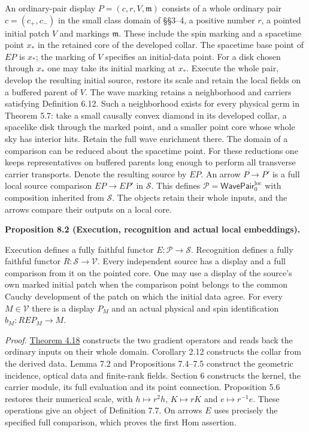 \documentclass[
  english,
  11pt,
  reqno]{amsart}
\makeatletter
\newcommand{\pandocstatementheading}[1]{%
  \par\addpenalty{\@beginparpenalty}%
  \addvspace{.5\baselineskip plus .2\baselineskip minus .2\baselineskip}%
  {\normalfont\bfseries #1\par}%
  \nobreak\@afterindenttrue\@afterheading
}
\makeatother
\begin{document}
An ordinary-pair display \(P=(c,r,V,\mathfrak m)\) consists of a whole
ordinary pair \(c=(c_+,c_-)\) in the small class domain of §§3--4, a
positive number \(r\), a pointed initial patch \(V\) and markings
\(\mathfrak m\). These include the spin marking and a spacetime point
\(x_*\) in the retained core of the developed collar. The spacetime base
point of \(EP\) is \(x_*\); the marking of \(V\) specifies an
initial-data point. For a disk chosen through \(x_*\) one may take its
initial marking at \(x_*\). Execute the whole pair, develop the
resulting initial source, restore its scale and retain the local fields
on a buffered parent of \(V\). The wave marking retains a neighborhood
and carriers satisfying Definition 6.12. Such a neighborhood exists for
every physical germ in Theorem 5.7: take a small causally convex diamond
in its developed collar, a spacelike disk through the marked point, and
a smaller point core whose whole sky has interior hits. Retain the full
wave enrichment there. The domain of a comparison can be reduced about
the spacetime point. For these reductions one keeps representatives on
buffered parents long enough to perform all transverse carrier
transports. Denote the resulting source by \(E P\). An arrow \(P\to P'\)
is a full local source comparison \(E P\to E P'\) in \(\mathcal S\).
This defines \(\mathcal P=\mathsf{WavePair}^{\mathrm{loc}}_0\) with
composition inherited from \(\mathcal S\). The objects retain their
whole inputs, and the arrows compare their outputs on a local core.

\pandocstatementheading{\leavevmode{}\label{prop:local-display-execution-recognition}Proposition 8.2 (Execution, recognition and actual local embeddings).}

Execution defines a fully faithful functor
\(E:\mathcal P\to\mathcal S\). Recognition defines a fully faithful
functor \(R:\mathcal S\to\mathcal V\). Every independent source has a
display and a full comparison from it on the pointed core. One may use a
display of the source's own marked initial patch when the comparison
point belongs to the common Cauchy development of the patch on which the
initial data agree. For every \(M\in\mathcal V\) there is a display
\(P_M\) and an actual physical and spin identification
\(b_M:R E P_M\to M\).

\emph{Proof.}
\hyperref[thm:online-ordinary-negative-response-initial-source]{Theorem
4.18} constructs the two gradient operators and reads back the ordinary
inputs on their whole domain. Corollary 2.12 constructs the collar from
the derived data. Lemma 7.2 and Propositions 7.4--7.5 construct the
geometric incidence, optical data and finite-rank fields. Section 6
constructs the kernel, the carrier module, its full evaluation and its
point connection. Proposition 5.6 restores their numerical scale, with
\(h\mapsto r^2h\), \(K\mapsto rK\) and \(e\mapsto r^{-1}e\). These
operations give an object of Definition 7.7. On arrows \(E\) uses
precisely the specified full comparison, which proves the first Hom
assertion.
\end{document}
